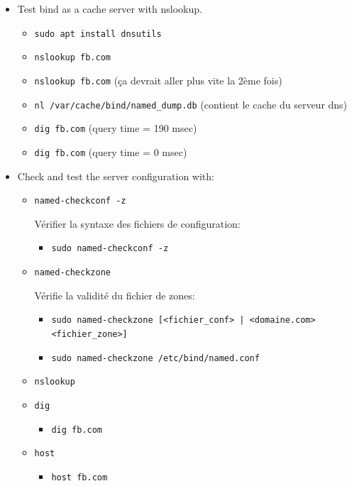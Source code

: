 \documentclass[a4paper]{article}
\begin{document}
\begin{itemize}
\item Test bind as a cache server with nslookup.
\begin{example}
    \begin{itemize}
        \item \texttt{sudo apt install dnsutils}
        \item \texttt{nslookup fb.com}
        \item \texttt{nslookup fb.com} (ça devrait aller plus vite la 2ème fois)
        \item \texttt{nl /var/cache/bind/named\_dump.db} (contient le cache du serveur dns)
        \item \texttt{dig fb.com} (query time = 190 msec)
        \item \texttt{dig fb.com} (query time = 0 msec)
    \end{itemize}
\end{example}

\item Check and test the server configuration with:
\begin{itemize}
    \item \texttt{named-checkconf -z}
    \begin{example}
        Vérifier la syntaxe des fichiers de configuration:
        \begin{itemize}
            \item \texttt{sudo named-checkconf -z}
        \end{itemize}
    \end{example}
    \item \texttt{named-checkzone}
    \begin{example}
        Vérifie la validité du fichier de zones:
        \begin{itemize}
            \item \texttt{sudo named-checkzone [<fichier\_conf> | <domaine.com> <fichier\_zone>]}
            \item \texttt{sudo named-checkzone /etc/bind/named.conf}
        \end{itemize}
    \end{example}
    \item \texttt{nslookup}
    \item \texttt{dig}
    \begin{example}
        \begin{itemize}
            \item \texttt{dig fb.com}
        \end{itemize}
    \end{example}
    \item \texttt{host}
    \begin{example}
        \begin{itemize}
            \item \texttt{host fb.com}
        \end{itemize}
    \end{example}
\end{itemize}


\end{itemize}
\end{document}
